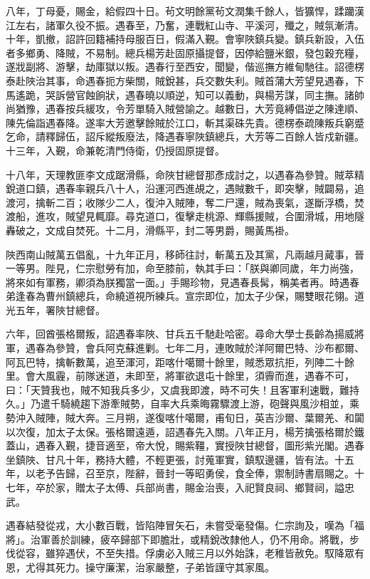 \begin{pinyinscope}
八年，丁母憂，賜金，給假四十日。茍文明餘黨茍文潤集千餘人，皆獷悍，蹂躪漢江左右，諸軍久役不振。遇春至，乃奮，連戰紅山寺、平溪河，殲之，賊氛漸清。十年，凱撤，詔許回籍補持母服百日，假滿入覲。會寧陜鎮兵變。鎮兵新設，入伍者多鄉勇、降賊，不易制。總兵楊芳赴固原攝提督，因停給鹽米銀，發包穀充糧，遂戕副將、游擊，劫庫獄以叛。遇春行至西安，聞變，偕巡撫方維甸馳往。詔德楞泰赴陜治其事，命遇春扼方柴關，賊銳甚，兵交數失利。賊首蒲大芳望見遇春，下馬遙跪，哭訴營官蝕餉狀，遇春曉以順逆，知可以義動，與楊芳謀，同主撫。諸帥尚猶豫，遇春按兵緩攻，令芳單騎入賊營諭之。越數日，大芳竟縛倡逆之陳達順、陳先倫詣遇春降。遂率大芳邀擊餘賊於江口，斬其渠硃先貴。德楞泰疏陳叛兵窮蹙乞命，請釋歸伍，詔斥縱叛廢法，降遇春寧陜鎮總兵，大芳等二百餘人皆戍新疆。十三年，入覲，命兼乾清門侍衛，仍授固原提督。

十八年，天理教匪李文成踞滑縣，命陜甘總督那彥成討之，以遇春為參贊。賊萃精銳道口鎮，遇春率親兵八十人，沿運河西進覘之，遇賊數千，即突擊，賊闢易，追渡河，擒斬二百；收隊少二人，復沖入賊陣，奪二尸還，賊為喪氣，遂斷浮橋，焚渡船，進攻，賊望見輒靡。尋克道口，復擊走桃源、輝縣援賊，合圍滑城，用地隧轟破之，文成自焚死。十二月，滑縣平，封二等男爵，賜黃馬褂。

陜西南山賊萬五倡亂，十九年正月，移師往討，斬萬五及其黨，凡兩越月蕆事，晉一等男。陛見，仁宗慰勞有加，命至膝前，執其手曰：「朕與卿同歲，年力尚強，將來如有軍務，卿須為朕獨當一面。」手賜珍物，見遇春長髯，稱美者再。時遇春弟逢春為曹州鎮總兵，命繞道視所練兵。宣宗即位，加太子少保，賜雙眼花翎。道光五年，署陜甘總督。

六年，回酋張格爾叛，詔遇春率陜、甘兵五千馳赴哈密。尋命大學士長齡為揚威將軍，遇春為參贊，會兵阿克蘇進剿。七年二月，連敗賊於洋阿爾巴特、沙布都爾、阿瓦巴特，擒斬數萬，追至渾河，距喀什噶爾十餘里，賊悉眾抗拒，列陣二十餘里。會大風霾，前隊迷道，未即至，將軍欲退屯十餘里，須霽而進，遇春不可，曰：「天贊我也，賊不知我兵多少，又虞我即渡，時不可失！且客軍利速戰，難持久。」乃遣千騎繞趨下游牽賊勢，自率大兵乘晦霧驟渡上游，砲聲與風沙相並，乘勢沖入賊陣，賊大奔。三月朔，遂復喀什噶爾，甫旬日，英吉沙爾、葉爾羌、和闐以次復，加太子太保。張格爾遠遁，詔遇春先入關。八年正月，楊芳擒張格爾於鐵蓋山，遇春入覲，捷音適至，帝大悅，賜紫韁，實授陜甘總督，圖形紫光閣。遇春坐鎮陜、甘凡十年，務持大體，不輕更張，討蒐軍實，鎮馭邊疆，皆有法。十五年，以老予告歸，召至京，陛辭，晉封一等昭勇侯，食全俸，禦制詩書扇賜之。十七年，卒於家，贈太子太傅、兵部尚書，賜金治喪，入祀賢良祠、鄉賢祠，謚忠武。

遇春結發從戎，大小數百戰，皆陷陣冒矢石，未嘗受毫發傷。仁宗詢及，嘆為「福將」。治軍善於訓練，疲卒歸部下即膽壯，或精銳改隸他人，仍不用命。將戰，步伐從容，雖猝遇伏，不至失措。俘虜必入賊三月以外始誅，老稚皆赦免。馭降眾有恩，尤得其死力。操守廉潔，治家嚴整，子弟皆謹守其家風。


\end{pinyinscope}
